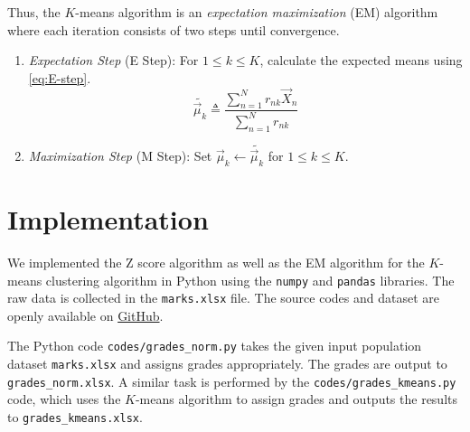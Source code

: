 \documentclass[conference]{IEEEtran}
\begin{document}
Thus, the $K$-means algorithm is an \emph{expectation maximization} (EM)
algorithm where each iteration consists of two steps until convergence.
\begin{enumerate}
    \item \emph{Expectation Step} (E Step): For $1 \le k \le K$, calculate the
    expected means using \eqref{eq:E-step}.
    \begin{equation}
        \tilde{\vec{\mu}_k} \triangleq \frac{\sum_{n=1}^Nr_{nk}\vec{X}_n}{\sum_{n=1}^Nr_{nk}}
        \label{eq:E-step}
    \end{equation}
    \item \emph{Maximization Step} (M Step): Set $\vec{\mu}_k \leftarrow
    \tilde{\vec{\mu}_k}$ for $1 \le k \le K$.
\end{enumerate}

\section{Implementation}
\label{sec:implementation}

We implemented the Z score algorithm as well as the EM algorithm for the
$K$-means clustering algorithm in Python using the \texttt{numpy} and
\texttt{pandas} libraries. The raw data is collected in the \texttt{marks.xlsx}
file. The source codes and dataset are openly available on
\href{https://github.com/gadepall/grading/tree/main/codes}{GitHub}.

The Python code \texttt{codes/grades\_norm.py} takes the given input population
dataset \texttt{marks.xlsx} and assigns grades appropriately. The grades are
output to \texttt{grades\_norm.xlsx}. A similar task is performed by the
\texttt{codes/grades\_kmeans.py} code, which uses the $K$-means algorithm to
assign grades and outputs the results to \texttt{grades\_kmeans.xlsx}.
\end{document}

